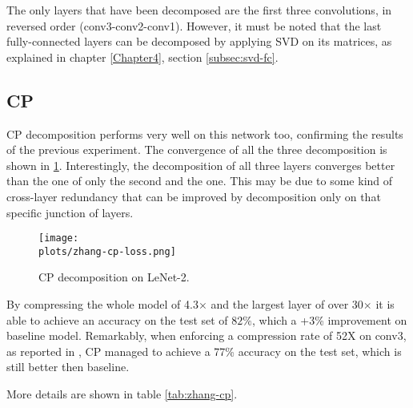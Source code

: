 The only layers that have been decomposed are the first three convolutions, in reversed order (conv3-conv2-conv1). However, it must be noted that the last fully-connected layers can be decomposed by applying SVD on its matrices, as explained in chapter \ref{Chapter4}, section \ref{subsec:svd-fc}. 

\subsection{CP}
CP decomposition performs very well on this network too, confirming the results of the previous experiment. 
The convergence of all the three decomposition is shown in \ref{fig:zhang-cp-loss}. Interestingly, the decomposition of all three layers converges better than the one of only the second and the one. This may be due to some kind of cross-layer redundancy that can be improved by decomposition only on that specific junction of layers. 

\begin{figure}[h!]
 \centering
 \texttt{[image: \\plots/zhang-cp-loss.png]} 
 \caption{CP decomposition on LeNet-2. }
 \label{fig:zhang-cp-loss}
\end{figure}


By compressing the whole model of 4.3$\times$ and the largest layer of over 30$\times$ it is able to achieve an accuracy on the test set of $82\%$, which a +3\% improvement on baseline model. Remarkably, when enforcing a compression rate of 52X on conv3, as reported in \parencite{zhang2015SVD}, CP managed to achieve a 77\% accuracy on the test set, which is still better then baseline. 

More details are shown in table \ref{tab:zhang-cp}. 

